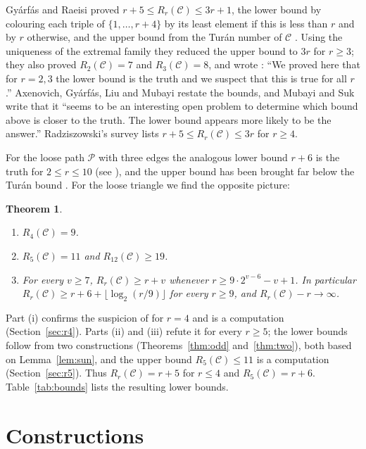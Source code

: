 \documentclass[11pt]{amsart}
\newtheorem{theorem}{Theorem}[section]
\theoremstyle{definition}
\theoremstyle{remark}
\newcommand{\C}{\mathcal{C}}
\begin{document}
Gy\'arf\'as and Raeisi \cite[Proposition 13]{GR} proved $r+5\le R_r(\C)\le 3r+1$, the lower bound by colouring
each triple of $\{1,\dots,r+4\}$ by its least element if this is less than $r$ and by $r$ otherwise, and the upper
bound from the Tur\'an number of $\C$ \cite{CK, FF}. Using the uniqueness of the extremal family \cite{CK} they
reduced the upper bound to $3r$ for $r\ge3$; they also proved $R_2(\C)=7$ and $R_3(\C)=8$, and wrote \cite[p.~8]{GR}:
``We proved here that for $r=2,3$ the lower bound is the truth and we suspect that this is true for all $r$.''
Axenovich, Gy\'arf\'as, Liu and Mubayi \cite[Proposition 3]{AGLM} restate the bounds, and Mubayi and Suk
\cite[Section 9]{MS} write that it ``seems to be an interesting open problem to determine which bound above is closer
to the truth. The lower bound appears more likely to be the answer.'' Radziszowski's survey \cite[item 7.2.2(a)]{DS1}
lists $r+5\le R_r(\C)\le 3r$ for $r\ge4$.

For the loose path $\mathcal P$ with three edges the analogous lower bound $r+6$ is the truth for $2\le r\le 10$ (see
\cite[item 7.2.2(b)]{DS1}), and the upper bound has been brought far below the Tur\'an bound \cite{LP, BZ}. For the
loose triangle we find the opposite picture:

\begin{theorem}\label{thm:main}
\begin{enumerate}[label=\textup{(\roman*)}]
\item $R_4(\C)=9$.
\item $R_5(\C)=11$ and $R_{12}(\C)\ge19$.
\item For every $v\ge7$, $R_r(\C)\ge r+v$ whenever $r\ge 9\cdot2^{v-6}-v+1$. In particular
$R_r(\C)\ge r+6+\lfloor\log_2(r/9)\rfloor$ for every $r\ge9$, and $R_r(\C)-r\to\infty$.
\end{enumerate}
\end{theorem}

Part (i) confirms the suspicion of \cite{GR} for $r=4$ and is a computation (Section~\ref{sec:r4}). Parts (ii) and
(iii) refute it for every $r\ge5$; the lower bounds follow from two constructions (Theorems~\ref{thm:odd}
and~\ref{thm:two}), both based on Lemma~\ref{lem:sun}, and the upper bound $R_5(\C)\le11$ is a computation
(Section~\ref{sec:r5}). Thus $R_r(\C)=r+5$ for $r\le4$ and $R_5(\C)=r+6$. Table~\ref{tab:bounds} lists the resulting lower bounds.

\section{Constructions}\label{sec:constr}
\end{document}
